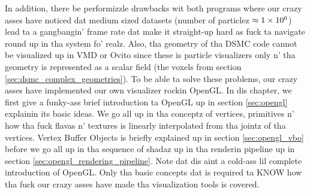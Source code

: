 In addition, there be performizzle drawbacks wit both programs where our crazy asses have noticed dat medium sized datasets (number of particlez $\approx 1\times 10^{6}$) lead ta a gangbangin' frame rate dat make it straight-up hard as fuck ta navigate round up in tha system fo' realz. Also, tha geometry of tha DSMC code cannot be visualized up in VMD or Ovito since these is particle visualizers only n' tha geometry is represented as a scalar field (the voxels from section \ref{sec:dsmc_complex_geometries}). To be able ta solve these problems, our crazy asses have implemented our own visualizer rockin OpenGL. In dis chapter, we first give a funky-ass brief introduction ta OpenGL up in section \ref{sec:opengl} explainin its basic ideas. We go all up in tha conceptz of vertices, primitives n' how tha fuck flavas n' textures is linearly interpolated from tha jointz of tha vertices. Vertex Buffer Objects is briefly explained up in section \ref{sec:opengl_vbo} before we go all up in tha sequence of shadaz up in tha renderin pipeline up in section \ref{sec:opengl_rendering_pipeline}. Note dat dis aint a cold-ass lil complete introduction of OpenGL. Only tha basic concepts dat is required ta KNOW how tha fuck our crazy asses have made tha visualization tools is covered.